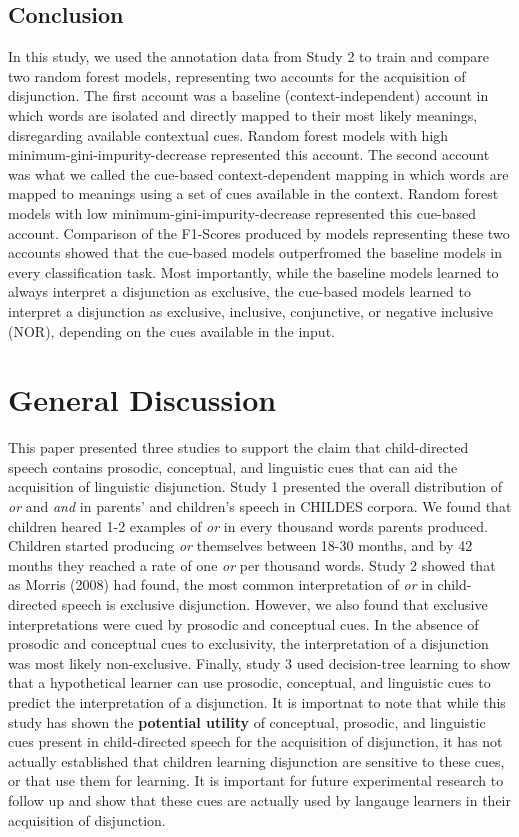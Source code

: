 \documentclass[,man,floatsintext]{apa6}
\begin{document}
\hypertarget{conclusion-1}{%
\subsection{Conclusion}\label{conclusion-1}}

In this study, we used the annotation data from Study 2 to train and compare two random forest models, representing two accounts for the acquisition of disjunction. The first account was a baseline (context-independent) account in which words are isolated and directly mapped to their most likely meanings, disregarding available contextual cues. Random forest models with high minimum-gini-impurity-decrease represented this account. The second account was what we called the cue-based context-dependent mapping in which words are mapped to meanings using a set of cues available in the context. Random forest models with low minimum-gini-impurity-decrease represented this cue-based account. Comparison of the F1-Scores produced by models representing these two accounts showed that the cue-based models outperfromed the baseline models in every classification task. Most importantly, while the baseline models learned to always interpret a disjunction as exclusive, the cue-based models learned to interpret a disjunction as exclusive, inclusive, conjunctive, or negative inclusive (NOR), depending on the cues available in the input.

\hypertarget{general-discussion}{%
\section{General Discussion}\label{general-discussion}}

This paper presented three studies to support the claim that child-directed speech contains prosodic, conceptual, and linguistic cues that can aid the acquisition of linguistic disjunction. Study 1 presented the overall distribution of \emph{or} and \emph{and} in parents' and children's speech in CHILDES corpora. We found that children heared 1-2 examples of \emph{or} in every thousand words parents produced. Children started producing \emph{or} themselves between 18-30 months, and by 42 months they reached a rate of one \emph{or} per thousand words. Study 2 showed that as Morris (2008) had found, the most common interpretation of \emph{or} in child-directed speech is exclusive disjunction. However, we also found that exclusive interpretations were cued by prosodic and conceptual cues. In the absence of prosodic and conceptual cues to exclusivity, the interpretation of a disjunction was most likely non-exclusive. Finally, study 3 used decision-tree learning to show that a hypothetical learner can use prosodic, conceptual, and linguistic cues to predict the interpretation of a disjunction. It is importnat to note that while this study has shown the \textbf{potential utility} of conceptual, prosodic, and linguistic cues present in child-directed speech for the acquisition of disjunction, it has not actually established that children learning disjunction are sensitive to these cues, or that use them for learning. It is important for future experimental research to follow up and show that these cues are actually used by langauge learners in their acquisition of disjunction.
\end{document}
